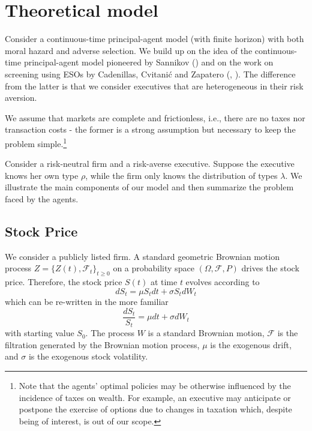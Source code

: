 \section{Theoretical model}
Consider a continuous-time principal-agent model (with finite horizon) with both moral hazard and adverse selection.
We build up on the idea of the continuous-time principal-agent model pioneered by Sannikov (\cite{sannikov2008continuous}) and on the work on screening using ESOs by Cadenillas, Cvitanić and Zapatero (\cite{cadenillas2002executive}, \cite{cadenillas2005executive}). The difference from the latter is that we consider executives that are heterogeneous in their risk aversion.

We assume that markets are complete and frictionless, i.e., there are no taxes nor transaction costs - the former is a strong assumption but necessary to keep the problem simple.\footnote{Note that the agents' optimal policies may be otherwise influenced by the incidence of taxes on wealth. For example, an executive may anticipate or postpone the exercise of options due to changes in taxation which, despite being of interest, is out of our scope.}

Consider a risk-neutral firm and a risk-averse executive. Suppose the executive knows her own type $\rho$, while the firm only knows the distribution of types $\lambda$. We illustrate the main components of our model and then summarize the problem faced by the agents.


\subsection{Stock Price}
We consider a publicly listed firm. A standard geometric Brownian motion process $Z = \{ Z(t), \mathscr{F}_t \}_{t \ge 0}$ on a probability space $(\Omega, \mathscr{F}, P)$ drives the stock price. 
Therefore, the stock price $S(t)$ at time $t$ evolves according to 
$$ dS_t = \mu S_t dt + \sigma S_t dW_t $$
which can be re-written in the more familiar
$$ \frac{dS_t}{S_t} = \mu dt + \sigma dW_t $$
with starting value $S_0$. The process $W$ is a standard Brownian motion, $\mathscr{F}$ is the filtration generated by the Brownian motion process, $\mu$ is the exogenous drift, and $\sigma$ is the exogenous stock volatility. 

